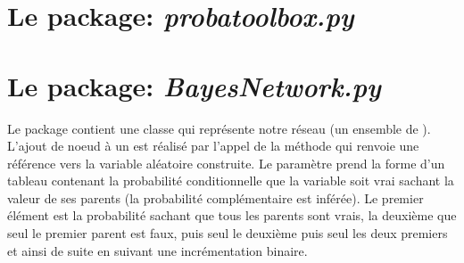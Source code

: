 \documentclass[11pt,letterpaper]{article}
\begin{document}
\section{Le package: \emph{probatoolbox.py}}
\label{probatoolbox}

\section{Le package: \emph{BayesNetwork.py}}
\label{bayesNetwork}
Le package  contient une classe  qui représente notre réseau (un ensemble de ). L'ajout de noeud à un  est réalisé par l'appel de la méthode  qui renvoie une référence vers la variable aléatoire construite. Le paramètre  prend la forme d'un tableau contenant la probabilité conditionnelle que la variable soit vrai sachant la valeur de ses parents (la probabilité complémentaire est inférée). Le premier élément est la probabilité sachant que tous les parents sont vrais, la deuxième que seul le premier parent est faux, puis seul le deuxième puis seul les deux premiers et ainsi de suite en suivant une incrémentation binaire.
\end{document}
